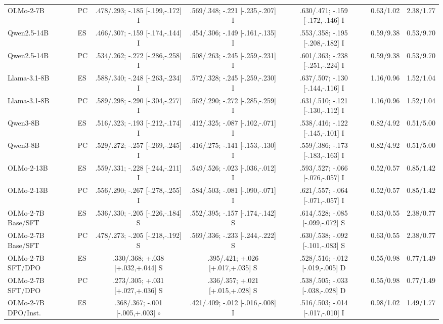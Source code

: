 \begin{table}[t]
\begin{tabular}{@{}llccc@{\hspace{6pt}}cc@{}}
OLMo-2-7B & PC & .478/.293; -.185 [-.199,-.172] I & .569/.348; -.221 [-.235,-.207] I & .630/.471; -.159 [-.172,-.146] I & 0.63/1.02 & 2.38/1.77 \\
Qwen2.5-14B & ES & .466/.307; -.159 [-.174,-.144] I & .454/.306; -.149 [-.161,-.135] I & .553/.358; -.195 [-.208,-.182] I & 0.59/9.38 & 0.53/9.70 \\
Qwen2.5-14B & PC & .534/.262; -.272 [-.286,-.258] I & .508/.263; -.245 [-.259,-.231] I & .601/.363; -.238 [-.251,-.224] I & 0.59/9.38 & 0.53/9.70 \\
Llama-3.1-8B & ES & .588/.340; -.248 [-.263,-.234] I & .572/.328; -.245 [-.259,-.230] I & .637/.507; -.130 [-.144,-.116] I & 1.16/0.96 & 1.52/1.04 \\
Llama-3.1-8B & PC & .589/.298; -.290 [-.304,-.277] I & .562/.290; -.272 [-.285,-.259] I & .631/.510; -.121 [-.130,-.112] I & 1.16/0.96 & 1.52/1.04 \\
Qwen3-8B & ES & .516/.323; -.193 [-.212,-.174] I & .412/.325; -.087 [-.102,-.071] I & .538/.416; -.122 [-.145,-.101] I & 0.82/4.92 & 0.51/5.00 \\
Qwen3-8B & PC & .529/.272; -.257 [-.269,-.245] I & .416/.275; -.141 [-.153,-.130] I & .559/.386; -.173 [-.183,-.163] I & 0.82/4.92 & 0.51/5.00 \\
OLMo-2-13B & ES & .559/.331; -.228 [-.244,-.211] I & .549/.526; -.023 [-.036,-.012] I & .593/.527; -.066 [-.076,-.057] I & 0.52/0.57 & 0.85/1.42 \\
OLMo-2-13B & PC & .556/.290; -.267 [-.278,-.255] I & .584/.503; -.081 [-.090,-.071] I & .621/.557; -.064 [-.071,-.057] I & 0.52/0.57 & 0.85/1.42 \\
OLMo-2-7B Base/SFT & ES & .536/.330; -.205 [-.226,-.184] S & .552/.395; -.157 [-.174,-.142] S & .614/.528; -.085 [-.099,-.072] S & 0.63/0.55 & 2.38/0.77 \\
OLMo-2-7B Base/SFT & PC & .478/.273; -.205 [-.218,-.192] S & .569/.336; -.233 [-.244,-.222] S & .630/.538; -.092 [-.101,-.083] S & 0.63/0.55 & 2.38/0.77 \\
OLMo-2-7B SFT/DPO & ES & .330/.368; +.038 [+.032,+.044] S & .395/.421; +.026 [+.017,+.035] S & .528/.516; -.012 [-.019,-.005] D & 0.55/0.98 & 0.77/1.49 \\
OLMo-2-7B SFT/DPO & PC & .273/.305; +.031 [+.027,+.036] S & .336/.357; +.021 [+.015,+.028] S & .538/.505; -.033 [-.038,-.028] D & 0.55/0.98 & 0.77/1.49 \\
OLMo-2-7B DPO/Inst. & ES & .368/.367; -.001 [-.005,+.003] $\circ$ & .421/.409; -.012 [-.016,-.008] I & .516/.503; -.014 [-.017,-.010] I & 0.98/1.02 & 1.49/1.77 \\

\end{tabular}
\end{table}
